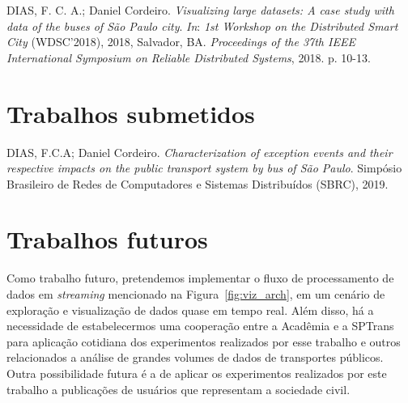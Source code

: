 \documentclass[
	12pt,				%
	oneside,			%
	a4paper,			%
	english,			%
	brazil				%
	]{abntex2ppgsi}
\begin{document}
{{{DIAS, F. C. A.; Daniel Cordeiro. \textit{Visualizing large datasets: A case study with data of the buses of São Paulo city}. \textit{In}: \textit{1st Workshop on the Distributed Smart City} (WDSC'2018), 2018, Salvador, BA. \textit{Proceedings of the 37th IEEE International Symposium on Reliable Distributed Systems}, 2018. p. 10-13.

\section{Trabalhos submetidos}

DIAS, F.C.A; Daniel Cordeiro. \textit{Characterization of exception events and their respective impacts on the public transport system by bus of São Paulo}. Simpósio Brasileiro de Redes de Computadores e Sistemas Distribuídos (SBRC), 2019.

\section{Trabalhos futuros}
Como trabalho futuro, pretendemos implementar o fluxo de processamento de dados em \textit{streaming} mencionado na Figura~\ref{fig:viz_arch}, em um cenário de exploração e visualização de dados quase em tempo real.  Além disso, há a necessidade de estabelecermos uma cooperação entre a Acadêmia e a SPTrans para aplicação cotidiana dos experimentos realizados por esse trabalho e outros relacionados a análise de grandes volumes de dados de transportes públicos. Outra possibilidade futura é a de aplicar os experimentos realizados por este trabalho a publicações de usuários que representam a sociedade civil.

\postextual



%
%


}}}
\end{document}
